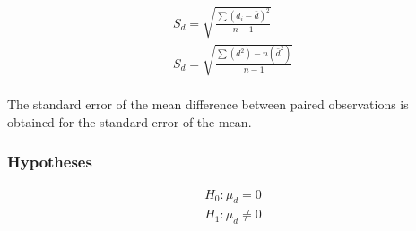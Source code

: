 \documentclass[a4paper,12pt]{article}
\begin{document}
\begin{eqnarray}
S_{d} = \sqrt{\frac{\sum (d_{i}-\bar{d})^2}{n-1}}\\
S_{d} = \sqrt{\frac{ \sum (d^2)- n(\bar{d}^2)}{n-1}}\\
\end{eqnarray}

The standard error of the mean difference between paired
observations is obtained for the standard error of the mean.
\subsubsection{Hypotheses}
\begin{eqnarray*}
H_{0}: \mu_{d} = 0\\
H_{1}: \mu_{d} \neq 0\\
\end{eqnarray*}
\end{document}
